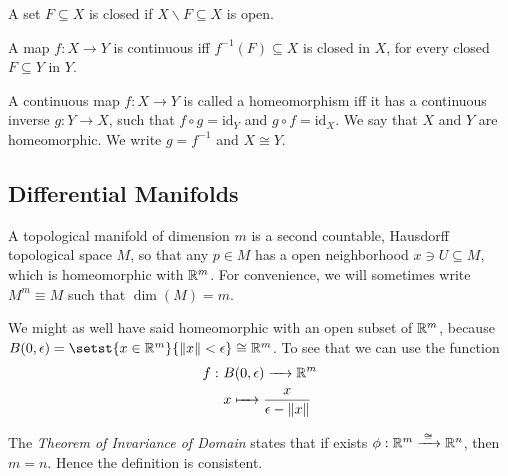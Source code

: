 \begin{definition}
	A set $F\subseteq X$ is closed if $X\backslash F \subseteq X$ is open.
\end{definition}

\begin{proposition}
	A map $f:X\to Y$ is continuous iff $f^{-1}(F) \subseteq X$ is closed in $X$, for every closed $F\subseteq Y$ in $Y$.
\end{proposition}

\begin{definition}
	A continuous map $f:X\to Y$ is called a homeomorphism iff it has a continuous inverse $g:Y\to X$, such that $f \circ g = \mathrm{id}_Y$ and $g \circ f = \mathrm{id}_X$. We say that $X$ and $Y$ are homeomorphic. We write $g=f^{-1}$ and $X \cong Y$. 
\end{definition}

\subsection{Differential Manifolds}

\begin{definition}
	A topological manifold of dimension $m$ is a second countable, Hausdorff topological space $M$, so that any $p \in M$ has a open neighborhood $x \ni U \subseteq M$, which is homeomorphic with $\mathbb R^m$. For convenience, we will sometimes write $M^m\equiv M$ such that $\dim(M)=m$.
\end{definition}

\begin{remark}
	We might as well have said homeomorphic with an open subset of $\mathbb R^m$, because $B(0,\epsilon) = \setst{x\in \bbR^m}{ \norm{x} < \epsilon } \cong \bbR^m$. To see that we can use the function
	\begin{align*}
		f:~&B(0,\epsilon) \to \bbR^m \\
		& x \mapsto \frac{x}{\epsilon-\norm{x}}
	\end{align*}
\end{remark}

\begin{remark}
	The \emph{Theorem of Invariance of Domain} states that if exists $\phi:\mathbb R^m \xrightarrow{\;\cong\;} \mathbb R^n$, then $m=n$. Hence the definition is consistent.
\end{remark}

